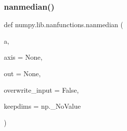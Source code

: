  \mbox{\label{namespacenumpy_1_1lib_1_1nanfunctions_ac8860b2b8666f170298c8e7c23cf592b}} 
\subsubsection{\texorpdfstring{nanmedian()}{nanmedian()}}
{\footnotesize\ttfamily def numpy.\+lib.\+nanfunctions.\+nanmedian (\begin{DoxyParamCaption}\item[{}]{a,  }\item[{}]{axis = {\ttfamily None},  }\item[{}]{out = {\ttfamily None},  }\item[{}]{overwrite\+\_\+input = {\ttfamily False},  }\item[{}]{keepdims = {\ttfamily np.\+\_\+NoValue} }\end{DoxyParamCaption})}

